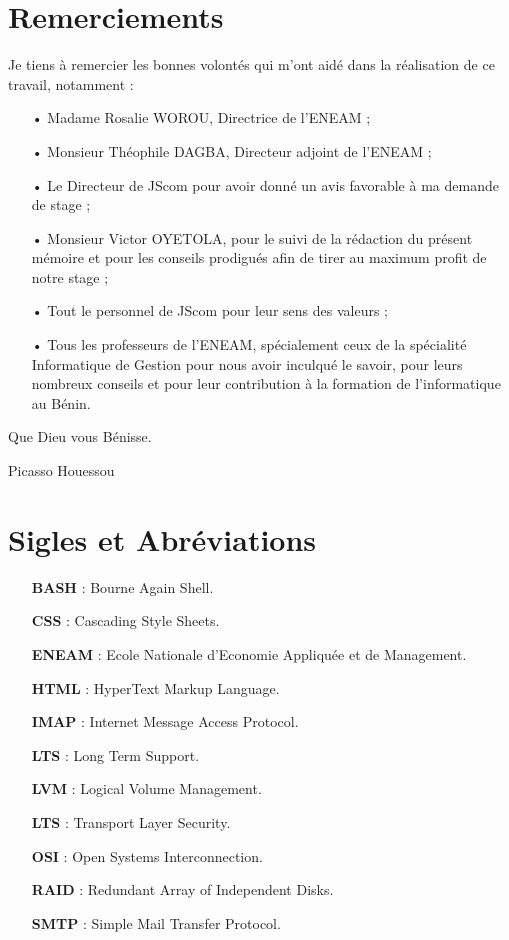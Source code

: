 \documentclass[a4paper,12pt,french]{report} %
\begin{document}
\chapter*{Remerciements}
	Je tiens à remercier les bonnes volontés qui m'ont aidé dans la réalisation de ce travail, notamment :
\begin{itemize}
	\item[•] Madame Rosalie WOROU, Directrice de l'ENEAM ;
 	\item[•] Monsieur Théophile DAGBA, Directeur adjoint de l'ENEAM ;
	\item[•] Le Directeur de JScom pour avoir donné un avis favorable à ma demande de stage ;
	\item[•] Monsieur Victor OYETOLA, pour le suivi de la rédaction du présent mémoire et pour les conseils prodigués afin de tirer au maximum profit de notre stage ;
	\item[•] Tout le personnel de JScom pour leur sens des valeurs ;
	\item[•] Tous les professeurs de l'ENEAM, spécialement ceux de la spécialité Informatique de Gestion pour nous avoir inculqué le savoir, pour leurs nombreux conseils et pour leur contribution à la formation de l'informatique au Bénin.	
\end{itemize}
Que Dieu vous Bénisse.
\begin{flushright}
Picasso Houessou
\end{flushright}

\chapter*{Sigles et Abréviations}
\begin{itemize}
\item[] \textbf{BASH} : Bourne Again Shell.
\item[] \textbf{CSS} : Cascading Style Sheets.
\item[] \textbf{ENEAM} : Ecole Nationale d'Economie Appliquée et de Management. %
\item[] \textbf{HTML} : HyperText Markup Language. %
\item[] \textbf{IMAP} : Internet Message Access Protocol.
\item[] \textbf{LTS} : Long Term Support.
\item[] \textbf{LVM} :  Logical Volume Management. %
\item[] \textbf{LTS} : Transport Layer Security.
\item[] \textbf{OSI} : Open Systems Interconnection.
\item[] \textbf{RAID} : Redundant Array of Independent Disks. %
\item[] \textbf{SMTP} : Simple Mail Transfer Protocol.
\end{itemize}
\end{document}

